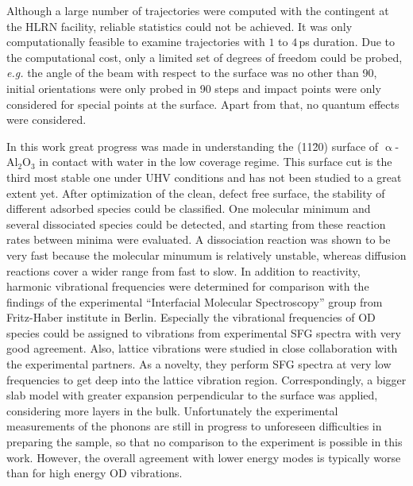 \documentclass[11pt,DIV=13,BCOR=5mm,a4paper,headinclude]{scrbook}
\begin{document}
Although a large number of trajectories were computed with the contingent at the HLRN facility, reliable statistics could not be achieved.
It was only computationally feasible to examine trajectories with $1$ to $4\,$ps duration.
Due to the computational cost, only a limited set of degrees of freedom could be probed, \textit{e.g.} the angle of the beam with respect to the surface was no other than 90\textdegree{}, initial orientations were only probed in 90\textdegree{} steps and impact points were only considered for special points at the surface.
Apart from that, no quantum effects were considered.
\clearpage



In this work great progress was made in understanding the (11\=20) surface of $\upalpha$-Al$_2$O$_3$ in contact with water in the low coverage regime.
This surface cut is the third most stable one under UHV conditions and has not been studied to a great extent yet.
After optimization of the clean, defect free surface, the stability of different adsorbed species could be classified.
One molecular minimum and several dissociated species could be detected, and starting from these reaction rates between minima were evaluated.
A dissociation reaction was shown to be very fast because the molecular minumum is relatively unstable, whereas diffusion reactions cover a wider range from fast to slow.
In addition to reactivity, harmonic vibrational frequencies were determined for comparison with the findings of the experimental ``Interfacial Molecular Spectroscopy'' group  from Fritz-Haber institute in Berlin.
Especially the vibrational frequencies of OD species could be assigned to vibrations from experimental SFG spectra with very good agreement.
Also, lattice vibrations were studied in close collaboration with the experimental partners.
As a novelty, they perform SFG spectra at very low frequencies to get deep into the lattice vibration region.
Correspondingly, a bigger slab model with greater expansion perpendicular to the surface was applied, considering more layers in the bulk.
Unfortunately the experimental measurements of the phonons are still in progress to unforeseen difficulties in preparing the sample, so that no comparison to the experiment is possible in this work.
However, the overall agreement with lower energy modes is typically worse than for high energy OD vibrations.
\\\\
\end{document}

